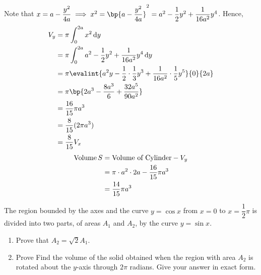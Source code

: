 \documentclass{echw}
\begin{document}
        
        \dash

        Note that $x = a-\dfrac{y^2}{4a} \implies x^2 = \bp{a - \dfrac{y^2}{4a}}^2 = a^2 - \dfrac12 y^2 + \dfrac1{16a^2}y^4$. Hence, 
        {\allowdisplaybreaks
        \begin{align*}
            V_y &= \pi \int_0^{2a} x^2 \d y\\
            &= \pi \int_0^{2a} a^2 - \dfrac12 y^2 + \dfrac1{16a^2}y^4 \d y\\
            &= \pi \evalint{a^2y - \dfrac12 \cdot \dfrac13 y^3 + \dfrac1{16a^2}\cdot \dfrac15 y^5}{0}{2a}\\
            &= \pi \bp{2a^3 - \dfrac{8a^3}6 + \dfrac{32a^5}{90a^2}}\\
            &= \dfrac{16}{15} \pi a^3\\
            &= \dfrac8{15} (2\pi a^3)\\
            &= \dfrac8{15} V_x
        \end{align*}}
        \dash
        \begin{align*}
            \operatorname{Volume} S &= \text{Volume of Cylinder} - V_y\\
            &= \pi \cdot a^2 \cdot 2a - \dfrac{16}{15} \pi a^3\\
            &= \dfrac{14}{15} \pi a^3
        \end{align*}
        

    \problem{}
        The region bounded by the axes and the curve $y = \cos x$ from $x = 0$ to $x = \dfrac12 \pi$ is divided into two parts, of areas $A_1$ and $A_2$, by the curve $y = \sin x$.

        \begin{enumerate}
            \item Prove that $A_2 = \sqrt2 A_1$.
            \item Prove Find the volume of the solid obtained when the region with area $A_2$ is rotated about the $y$-axis through $2\pi$ radians. Give your answer in exact form.
        \end{enumerate}
\end{document}
